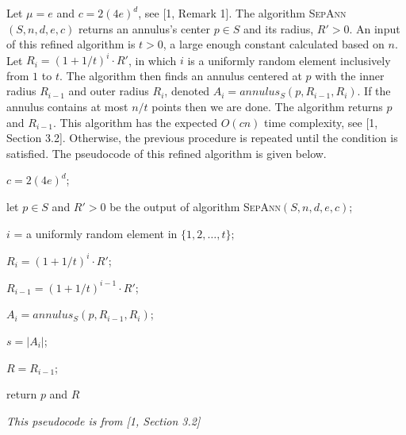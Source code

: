 \documentclass[12pt,english,]{article}
\let\origfigure\figure
\let\endorigfigure\endfigure
\renewenvironment{figure}[1][2] {
    \expandafter\origfigure\expandafter[H]
} {
    \endorigfigure
}
\begin{document}
Let \(\mu = e\) and \(c = 2(4e)^d\), see {[}1, Remark 1{]}. The
algorithm \textsc{SepAnn$(S,n,d,e,c)$} returns an annulus's center
\(p \in S\) and its radius, \(R'>0\). An input of this refined algorithm
is \(t > 0\), a large enough constant calculated based on \(n\). Let
\(R_i = (1+1/t)^i\cdot R'\), in which \(i\) is a uniformly random
element inclusively from \(1\) to \(t\). The algorithm then finds an
annulus centered at \(p\) with the inner radius \(R_{i-1}\) and outer
radius \(R_{i}\), denoted \(A_i = annulus_S(p, R_{i-1}, R_i)\). If the
annulus contains at most \(n/t\) points then we are done. The algorithm
returns \(p\) and \(R_{i-1}\). This algorithm has the expected \(O(cn)\)
time complexity, see {[}1, Section 3.2{]}. Otherwise, the previous
procedure is repeated until the condition is satisfied. The pseudocode
of this refined algorithm is given below.

\begin{figure}[ht] \centering
  \begin{minipage}{1\linewidth}
    {\LinesNotNumbered
    \begin{algorithm}[H]
    \SetAlgoLined
    \BlankLine

    \centering
    \begin{minipage}{.80\linewidth}
    $c = 2(4e)^d$;

    let $p\in S$ and $R' > 0$ be the output of algorithm \textsc{SepAnn$(S,n,d,e,c)$};

      {$i$ = a uniformly random element in $\{1, 2,\ldots, t\};$

      $R_i = (1+1/t)^i\cdot R'$;

      $R_{i-1} = (1+1/t)^{i-1}\cdot R'$;

      $A_i = annulus_S(p,R_{i-1},R_i)$;

      $s = |A_i|$;
      }
      $R = R_{i-1}$;

      return $p$ and $R$
    \end{minipage}
    \caption{\textsc{SparseSepAnn}$(S,n,d,t)$}
    \end{algorithm}}
  \end{minipage}
  \begin{minipage}{1\textwidth}
    \begin{flushright}
    {\footnotesize \emph{This pseudocode is from [1, Section 3.2]}\par}
    \end{flushright}
  \end{minipage}
\end{figure}
\end{document}
